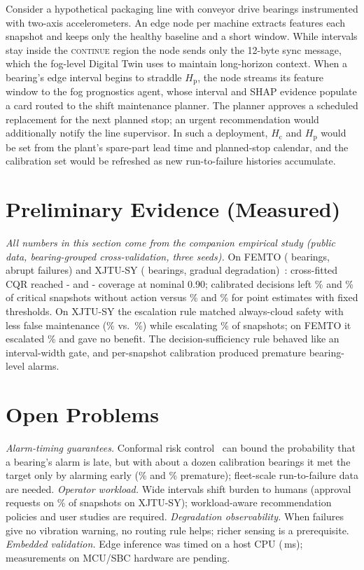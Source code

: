 \documentclass[conference]{IEEEtran}
\newcommand{\Hc}{H_{\mathrm{c}}}
\newcommand{\Hp}{H_{\mathrm{p}}}
\begin{document}
Consider a hypothetical packaging line with conveyor drive bearings instrumented with two-axis accelerometers. An edge node per machine extracts features each snapshot and keeps only the healthy baseline and a short window. While intervals stay inside the \textsc{continue} region the node sends only the 12-byte sync message, which the fog-level Digital Twin uses to maintain long-horizon context. When a bearing's edge interval begins to straddle $\Hp$, the node streams its feature window to the fog prognostics agent, whose interval and SHAP evidence populate a card routed to the shift maintenance planner. The planner approves a scheduled replacement for the next planned stop; an urgent recommendation would additionally notify the line supervisor. In such a deployment, $\Hc$ and $\Hp$ would be set from the plant's spare-part lead time and planned-stop calendar, and the calibration set would be refreshed as new run-to-failure histories accumulate.

\section{Preliminary Evidence (Measured)}
\emph{All numbers in this section come from the companion empirical study (public data, bearing-grouped cross-validation, three seeds).}
On FEMTO (\feNBearings{} bearings, abrupt failures) and XJTU-SY (\xjNBearings{} bearings, gradual degradation)~\cite{nectoux2012pronostia,wang2020xjtu}: cross-fitted CQR reached \fePicpEdge-\fePicpCloud{} and \xjPicpCloud-\xjPicpEdge{} coverage at nominal 0.90; calibrated decisions left \feUnsafeHera\% and \xjUnsafeHera\% of critical snapshots without action versus \feUnsafePoint\% and \xjUnsafePoint\% for point estimates with fixed thresholds. On XJTU-SY the escalation rule matched always-cloud safety with less false maintenance (\xjFmHera\% vs.\ \xjFmCloud\%) while escalating \xjEscHera\% of snapshots; on FEMTO it escalated \feEscHera\% and gave no benefit. The decision-sufficiency rule behaved like an interval-width gate, and per-snapshot calibration produced premature bearing-level alarms.

\section{Open Problems}
\textit{Alarm-timing guarantees.} Conformal risk control~\cite{angelopoulos2024crc} can bound the probability that a bearing's alarm is late, but with about a dozen calibration bearings it met the target only by alarming early (\fePremCrcTen\% and \xjPremCrcTen\% premature); fleet-scale run-to-failure data are needed.
\textit{Operator workload.} Wide intervals shift burden to humans (approval requests on \xjApprHera\% of snapshots on XJTU-SY); workload-aware recommendation policies and user studies are required.
\textit{Degradation observability.} When failures give no vibration warning, no routing rule helps; richer sensing is a prerequisite.
\textit{Embedded validation.} Edge inference was timed on a host CPU (\feEdgeLat\,ms); measurements on MCU/SBC hardware are pending.
\end{document}

